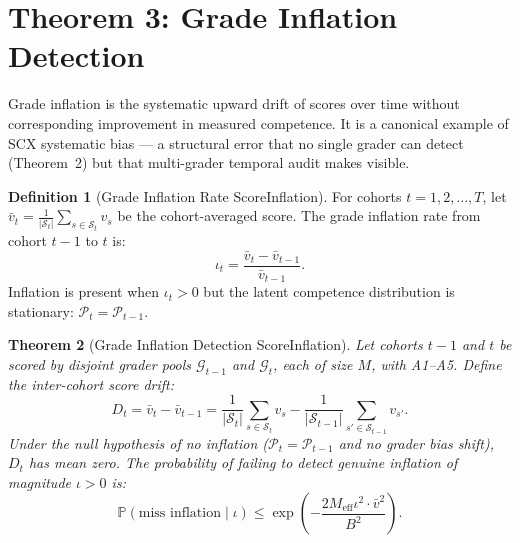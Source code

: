 \documentclass[11pt,a4paper]{article}
\newtheorem{theorem}{Theorem}[section]
\theoremstyle{definition}
\newtheorem{definition}[theorem]{Definition}
\theoremstyle{remark}
\newcommand{\SCX}{\textsc{SCX}}
\newcommand{\Pbb}{\mathbb{P}}
\newcommand{\cG}{\mathcal{G}}
\newcommand{\cP}{\mathcal{P}}
\newcommand{\cS}{\mathcal{S}}
\newcommand{\studentSet}{\cS}
\newcommand{\inflationRate}{\iota}
\begin{document}
\section{Theorem 3: Grade Inflation Detection}
\label{sec:theorem3}
Grade inflation is the systematic upward drift of scores over time without corresponding improvement in measured competence. It is a canonical example of \SCX{} systematic bias — a structural error that no single grader can detect (Theorem~2) but that multi-grader temporal audit makes visible.
\begin{definition}[Grade Inflation Rate ScoreInflation]
\label{def:inflation}
For cohorts $t = 1, 2, \ldots, T$, let $\bar{v}_t = \frac{1}{|\studentSet_t|}\sum_{s \in \studentSet_t} v_s$ be the cohort-averaged score. The grade inflation rate from cohort $t-1$ to $t$ is:
\begin{equation}
    \inflationRate_t = \frac{\bar{v}_t - \bar{v}_{t-1}}{\bar{v}_{t-1}}.
\end{equation}
Inflation is present when $\inflationRate_t > 0$ but the latent competence distribution is stationary: $\cP_t = \cP_{t-1}$.
\end{definition}
\begin{theorem}[Grade Inflation Detection ScoreInflation]
\label{thm:inflation}
Let cohorts $t-1$ and $t$ be scored by disjoint grader pools $\cG_{t-1}$ and $\cG_t$, each of size $M$, with A1--A5. Define the inter-cohort score drift:
\begin{equation}
    D_t = \bar{v}_t - \bar{v}_{t-1} = \frac{1}{|\studentSet_t|}\sum_{s \in \studentSet_t} v_s - \frac{1}{|\studentSet_{t-1}|}\sum_{s' \in \studentSet_{t-1}} v_{s'}.
\end{equation}
Under the null hypothesis of no inflation ($\cP_t = \cP_{t-1}$ and no grader bias shift), $D_t$ has mean zero. The probability of failing to detect genuine inflation of magnitude $\inflationRate > 0$ is:
\begin{equation}
    \Pbb(\text{miss inflation} \mid \inflationRate) \le \exp\left(-\frac{2 M_{\text{eff}} \inflationRate^2 \cdot \bar{v}^2}{B^2}\right).
    \label{eq:inflation_detection}
\end{equation}
\end{theorem}
\end{document}
